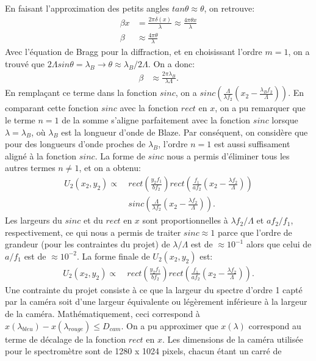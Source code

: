 \documentclass[conference]{IEEEtran}
\begin{document}
En faisant l'approximation des petits angles $tan\theta\approx\theta$, on retrouve:
\begin{align*}
   \beta x &=\frac{2\pi\delta(x)}{\lambda} \approx\frac{4\pi\theta x}{\lambda}\\
   \beta&\approx \frac{4\pi\theta}{\lambda}
\end{align*} 
Avec l'équation de Bragg pour la diffraction, et en choisissant l'ordre $m=1$, on a trouvé que $2\Lambda sin\theta=\lambda_B \rightarrow \theta\approx\lambda_B/2\Lambda$.
On a donc:
\begin{align*}
   \beta&\approx \frac{2\pi\lambda_B}{\lambda\Lambda}.
\end{align*}
En remplaçant ce terme dans la fonction $sinc$, on a $sinc(\frac{\Lambda}{\lambda f_2}(x_2-\frac{\lambda_B f_2}{\Lambda}))$. En comparant cette
fonction $sinc$ avec la fonction $rect$ en $x$, on a pu remarquer que le terme $n=1$ de la somme s'aligne parfaitement 
avec la fonction $sinc$ lorsque $\lambda=\lambda_B$, où $\lambda_B$ est la longueur d'onde de Blaze. Par conséquent, on considère que pour des longueurs d'onde proches
de $\lambda_B$, l'ordre $n=1$ est aussi suffisament aligné à la fonction $sinc$. La forme de $sinc$ nous a permis d'éliminer tous les autres termes $n\neq1$, et on a obtenu:
\begin{align*}
    U_2(x_2,y_2)\propto&\ rect(\frac{y_2 f_1}{b f_2})rect(\frac{f_1}{a f_2}(x_2-\frac{\lambda f_2}{\Lambda}))\\
    & \ sinc(\frac{\Lambda}{\lambda f_2}(x_2-\frac{\lambda f_2}{\Lambda})).
\end{align*}
Les largeurs du $sinc$ et du $rect$ en $x$ sont proportionnelles à $\lambda f_2/\Lambda$ et $af_2/f_1$, respectivement, ce qui nous
a permis de traiter $sinc\approx1$ parce que l'ordre de grandeur (pour les contraintes du projet) de $\lambda/\Lambda$ est de $\approx10^{-1}$ alors que celui de $a/f_1$ est
de $\approx10^{-2}$. La forme finale de $U_2(x_2,y_2)$ est:
\begin{align*}
    U_2(x_2,y_2)\propto&\ rect(\frac{y_2 f_1}{b f_2})rect(\frac{f_1}{a f_2}(x_2-\frac{\lambda f_2}{\Lambda})).
\end{align*}
Une contrainte du projet consiste à ce que la largeur du spectre d'ordre 1 capté par la caméra
soit d'une largeur équivalente ou légèrement inférieure à la largeur de la caméra. Mathématiquement, ceci correspond à
$x(\lambda_{bleu})-x(\lambda_{rouge})\leq D_{cam}$. On a pu approximer que $x(\lambda)$ correspond au terme de décalage
de la fonction $rect$ en $x$. Les dimensions de la caméra utilisée pour le spectromètre sont de 1280 x 1024 pixels, chacun étant un carré de
\end{document}
